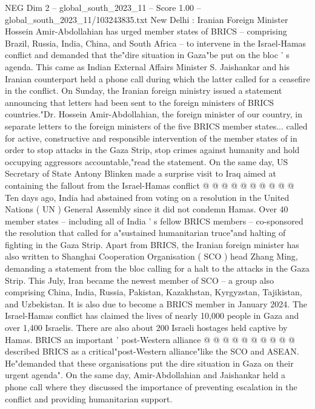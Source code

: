 \begin{textsample}{NEG Dim 2 – global\_south\_2023\_11 – Score 1.00 – global\_south\_2023\_11/103243835.txt}  \label{ex:f2_neg_356}
New Delhi : Iranian Foreign Minister Hossein Amir-Abdollahian has urged member states of BRICS -- comprising Brazil, Russia, India, China, and South Africa -- to intervene in the Israel-Hamas conflict and demanded that the"dire situation in Gaza"be put on the bloc ' s agenda.
This came as Indian External Affairs Minister S.
Jaishankar and his Iranian counterpart held a phone call during which the latter called for a ceasefire in the conflict.
On Sunday, the Iranian foreign ministry issued a statement announcing that letters had been sent to the foreign ministers of BRICS countries."Dr.
Hossein Amir-Abdollahian, the foreign minister of our country, in separate letters to the foreign ministers of the five BRICS member states... called for active, constructive and responsible intervention of the member states of in order to stop attacks in the Gaza Strip, stop crimes against humanity and hold occupying aggressors accountable,"read the statement.
On the same day, US Secretary of State Antony Blinken made a surprise visit to Iraq aimed at containing the fallout from the Israel-Hamas conflict @ @ @ @ @ @ @ @ @ @ Ten days ago, India had abstained from voting on a resolution in the United Nations ( UN ) General Assembly since it did not condemn Hamas.
Over 40 member states -- including all of India ' s fellow BRICS members -- co-sponsored the resolution that called for a"sustained humanitarian truce"and halting of fighting in the Gaza Strip.
Apart from BRICS, the Iranian foreign minister has also written to Shanghai Cooperation Organisation ( SCO ) head Zhang Ming, demanding a statement from the bloc calling for a halt to the attacks in the Gaza Strip.
This July, Iran became the newest member of SCO -- a group also comprising China, India, Russia, Pakistan, Kazakhstan, Kyrgyzstan, Tajikistan, and Uzbekistan.
It is also due to become a BRICS member in January 2024.
The Israel-Hamas conflict has claimed the lives of nearly 10,000 people in Gaza and over 1,400 Israelis.
There are also about 200 Israeli hostages held captive by Hamas.
BRICS an important ' post-Western alliance @ @ @ @ @ @ @ @ @ @ described BRICS as a critical"post-Western alliance"like the SCO and ASEAN.
He"demanded that these organisations put the dire situation in Gaza on their urgent agenda".
On the same day, Amir-Abdollahian and Jaishankar held a phone call where they discussed the importance of preventing escalation in the conflict and providing humanitarian support.

\end{textsample}
